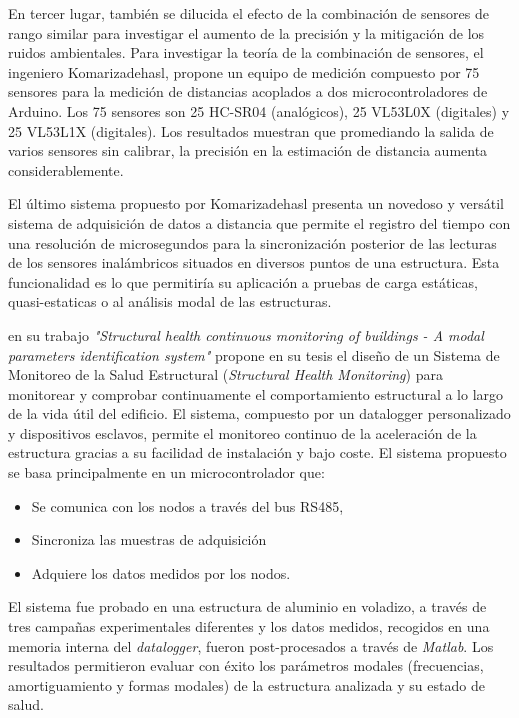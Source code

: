 En tercer lugar, también se dilucida el efecto de la combinación de sensores de rango similar para investigar el aumento de la precisión y la mitigación de los ruidos ambientales. Para investigar la teoría de la combinación de sensores, el ingeniero Komarizadehasl, propone un equipo de medición compuesto por 75 sensores para la medición de distancias acoplados a dos microcontroladores de Arduino. Los 75 sensores son 25 HC-SR04 (analógicos), 25 VL53L0X (digitales) y 25 VL53L1X (digitales). Los resultados muestran que promediando la salida de varios sensores sin calibrar, la precisión en la estimación de distancia aumenta considerablemente.

El último sistema propuesto por Komarizadehasl presenta un novedoso y versátil sistema de adquisición de datos a distancia que permite el registro del tiempo con una resolución de microsegundos para la sincronización posterior de las lecturas de los sensores inalámbricos situados en diversos puntos de una estructura. Esta funcionalidad es lo que permitiría su aplicación a pruebas de carga estáticas, quasi-estaticas o al análisis modal de las estructuras.

\cite{muttillo2019structural} en su trabajo \textit{"Structural health continuous monitoring of buildings - A modal parameters identification system"} propone en su tesis el diseño de un Sistema de Monitoreo de la Salud Estructural (\textit{Structural Health Monitoring}) para monitorear y comprobar continuamente el comportamiento estructural a lo largo de la vida útil del edificio. El sistema, compuesto por un datalogger personalizado y dispositivos esclavos, permite el monitoreo continuo de la aceleración de la estructura gracias a su facilidad de instalación y bajo coste. El sistema propuesto se basa principalmente en un microcontrolador que: 

\begin{itemize}
	\item Se comunica con los nodos a través del bus RS485, 
	\item Sincroniza las muestras de adquisición
	\item Adquiere los datos medidos por los nodos.
\end{itemize} 

El sistema fue probado en una estructura de aluminio en voladizo, a través de tres campañas experimentales diferentes y los datos medidos, recogidos en una memoria interna del \textit{datalogger}, fueron post-procesados a través de \textit{Matlab}. Los resultados permitieron evaluar con éxito los parámetros modales (frecuencias, amortiguamiento y formas modales) de la estructura analizada y su estado de salud.

